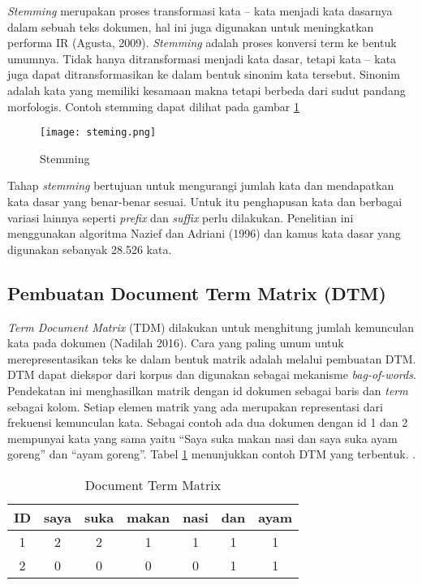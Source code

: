 \textit{Stemming} merupakan proses transformasi kata – kata menjadi kata dasarnya dalam sebuah teks dokumen, hal ini juga digunakan untuk meningkatkan performa IR (Agusta, 2009). \textit{Stemming} adalah  proses  konversi term ke  bentuk  umumnya. Tidak hanya ditransformasi menjadi kata dasar, tetapi kata – kata juga dapat ditransformasikan ke dalam bentuk sinonim kata tersebut. Sinonim adalah kata yang memiliki kesamaan makna tetapi berbeda dari sudut pandang morfologis. Contoh stemming dapat dilihat pada gambar \ref{fig:steming} 

\begin{figure}[h!] %
	\centering
	\texttt{[image: steming.png]}
	\caption{Stemming}
	\label{fig:steming}
\end{figure}

Tahap \textit{stemming} bertujuan untuk mengurangi jumlah kata dan mendapatkan kata dasar yang benar-benar sesuai. Untuk itu penghapusan kata dan berbagai variasi lainnya seperti \textit{prefix} dan \textit{suffix} perlu dilakukan. Penelitian ini menggunakan algoritma Nazief dan Adriani (1996) dan kamus kata dasar  yang digunakan sebanyak 28.526 kata.

\subsection*{Pembuatan Document Term Matrix (DTM)}

\textit{Term Document Matrix} (TDM) dilakukan untuk menghitung jumlah kemunculan kata pada dokumen (Nadilah 2016). Cara yang paling umum untuk merepresentasikan teks ke dalam bentuk matrik adalah melalui pembuatan DTM. DTM dapat diekspor dari korpus dan digunakan sebagai mekanisme \textit{bag-of-words}. Pendekatan ini menghasilkan matrik dengan id dokumen sebagai baris dan \textit{term} sebagai kolom. Setiap elemen matrik yang ada merupakan representasi dari frekuensi kemunculan kata.
Sebagai contoh ada dua dokumen dengan id 1 dan 2 mempunyai kata yang sama yaitu “Saya suka makan nasi dan saya suka ayam goreng” dan “ayam goreng”. Tabel \ref{tab:dtm} menunjukkan contoh DTM yang terbentuk.
.

\begin{table}[hbt]
	\caption{Document Term Matrix}
	\centering
	\begin{adjustbox}{max width=\textwidth}
		\begin{tabular}{*{7}{c}}%
			\toprule
			ID & saya & suka & makan & nasi & dan & ayam \\
			\midrule
			1 & 2 & 2 & 1 & 1 & 1 & 1 \\
			2 & 0 & 0 & 0 & 0 & 1 & 1 \\
			\bottomrule
		\end{tabular}
	\end{adjustbox}
	\label{tab:dtm}
\end{table}

